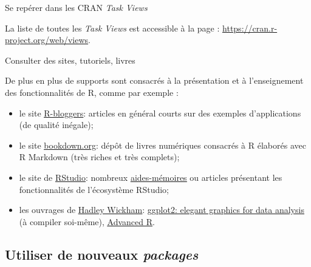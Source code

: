\documentclass[12pt,ignorenonframetext,handout,]{beamer}
\begin{document}
\begin{frame}{Se repérer dans les CRAN \protect\textit{Task Views}}
\pause \bigskip \normalsize

La liste de toutes les \emph{Task Views} est accessible à la page :
\href{https://cran.r-project.org/web/views}{\underline{https://cran.r-project.org/web/views}}.

\end{frame}

\begin{frame}{Consulter des sites, tutoriels, livres}
\protect\hypertarget{consulter-des-sites-tutoriels-livres}{}

De plus en plus de supports sont consacrés à la présentation et à
l’enseignement des fonctionnalités de R, comme par exemple :

\begin{itemize}
\item
  \pause le site
  \href{https://www.r-bloggers.com}{\underline{R-bloggers}}: articles en
  général courts sur des exemples d’applications (de qualité inégale);
\item
  \pause le site \href{https://bookdown.org}{\underline{bookdown.org}}:
  dépôt de livres numériques consacrés à R élaborés avec R Markdown
  (très riches et très complets);
\item
  \pause le site de \href{https://www.rstudio.com}{\underline{RStudio}}:
  nombreux
  \href{https://www.rstudio.com/resources/cheatsheets/}{\underline{aides-mémoires}}
  ou articles présentant les fonctionnalités de l’écosystème RStudio;
\item
  \pause les ouvrages de
  \href{http://hadley.nz}{\underline{Hadley Wickham}}:
  \href{https://github.com/hadley/ggplot2-book}{\underline{ggplot2: elegant graphics for data analysis}}
  (à compiler soi-même),
  \href{http:/:adv-r.had.co.nz}{\underline{Advanced R}}.
\end{itemize}

\end{frame}

\hypertarget{utiliser-de-nouveaux}{%
\subsection{\texorpdfstring{Utiliser de nouveaux
\protect\textit{packages}}{Utiliser de nouveaux }}\label{utiliser-de-nouveaux}}
\end{document}

